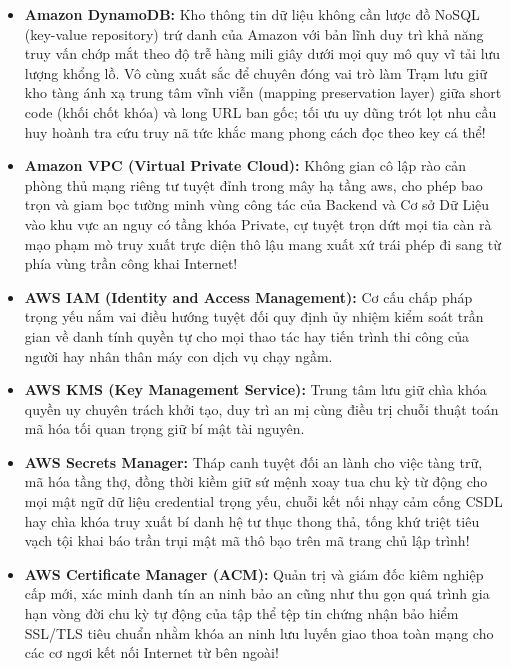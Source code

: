 \begin{itemize}
  mã chuỗi thu gọn (short code) đã được KGS chuẩn bị sẵn để Backend ung
  dung vớt chiết rút chớp nhoáng tức nghẽn mỗi lần ghi chép lệnh.
\item
  \textbf{Amazon DynamoDB:} Kho thông tin dữ liệu không cần lược đồ
  NoSQL (key-value repository) trứ danh của Amazon với bản lĩnh duy trì
  khả năng truy vấn chớp mắt theo độ trễ hàng mili giây dưới mọi quy mô
  quy vĩ tải lưu lượng khổng lồ. Vô cùng xuất sắc để chuyên đóng vai trò
  làm Trạm lưu giữ kho tàng ánh xạ trung tâm vĩnh viễn (mapping
  preservation layer) giữa short code (khối chốt khóa) và long URL ban
  gốc; tối ưu uy dũng trót lọt nhu cầu huy hoành tra cứu truy nã tức
  khắc mang phong cách đọc theo key cá thể!
\item
  \textbf{Amazon VPC (Virtual Private Cloud):} Không gian cô lập rào cản
  phòng thủ mạng riêng tư tuyệt đỉnh trong mây hạ tầng aws, cho phép bao
  trọn và giam bọc tường minh vùng công tác của Backend và Cơ sở Dữ Liệu
  vào khu vực an nguy có tầng khóa Private, cự tuyệt trọn dứt mọi tia
  càn rà mạo phạm mò truy xuất trực diện thô lậu mang xuất xứ trái phép
  đi sang từ phía vùng trần công khai Internet!
\item
  \textbf{AWS IAM (Identity and Access Management):} Cơ cấu chấp pháp
  trọng yếu nắm vai điều hướng tuyệt đối quy định ủy nhiệm kiểm soát
  trần gian về danh tính quyền tự cho mọi thao tác hay tiến trình thi
  công của người hay nhân thân máy con dịch vụ chạy ngầm.
\item
  \textbf{AWS KMS (Key Management Service):} Trung tâm lưu giữ chìa khóa
  quyền uy chuyên trách khởi tạo, duy trì an mị cùng điều trị chuỗi
  thuật toán mã hóa tối quan trọng giữ bí mật tài nguyên.
\item
  \textbf{AWS Secrets Manager:} Tháp canh tuyệt đối an lành cho việc
  tàng trữ, mã hóa tầng thợ, đồng thời kiềm giữ sứ mệnh xoay tua chu kỳ
  từ động cho mọi mật ngữ dữ liệu credential trọng yếu, chuỗi kết nối
  nhạy cảm cống CSDL hay chìa khóa truy xuất bí danh hệ tư thục thong
  thả, tống khứ triệt tiêu vạch tội khai báo trần trụi mật mã thô bạo
  trên mã trang chủ lập trình!
\item
  \textbf{AWS Certificate Manager (ACM):} Quản trị và giám đốc kiêm
  nghiệp cấp mới, xác minh danh tín an ninh bảo an cũng như thu gọn quá
  trình gia hạn vòng đời chu kỳ tự động của tập thể tệp tin chứng nhận
  bảo hiểm SSL/TLS tiêu chuẩn nhằm khóa an ninh lưu luyến giao thoa toàn
  mạng cho các cơ ngơi kết nối Internet từ bên ngoài!
\end{itemize}

